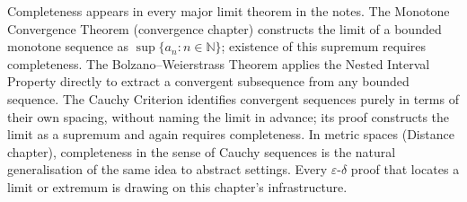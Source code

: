 \begin{remark*}
Completeness appears in every major limit theorem in the notes.
The Monotone Convergence Theorem (convergence chapter) constructs the
limit of a bounded monotone sequence as $\sup\{a_n : n \in \mathbb{N}\}$;
existence of this supremum requires completeness.
The Bolzano--Weierstrass Theorem applies the Nested Interval Property
directly to extract a convergent subsequence from any bounded sequence.
The Cauchy Criterion identifies convergent sequences purely in terms of
their own spacing, without naming the limit in advance; its proof
constructs the limit as a supremum and again requires completeness.
In metric spaces (Distance chapter), completeness in the sense of
Cauchy sequences is the natural generalisation of the same idea to
abstract settings.
Every $\varepsilon$-$\delta$ proof that locates a limit or extremum is
drawing on this chapter's infrastructure.
\end{remark*}